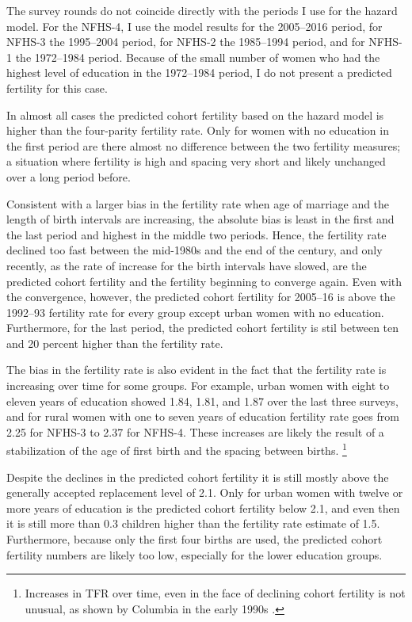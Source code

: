 \documentclass[12pt,letterpaper]{article}
\begin{document}
The survey rounds do not coincide directly with the periods I use for the hazard model.
For the NFHS-4, I use the model results for the 2005--2016 period, 
for NFHS-3 the 1995--2004 period, 
for NFHS-2 the 1985--1994 period, 
and for NFHS-1 the 1972--1984 period.
Because of the small number of women who had the highest level of education in the
1972--1984 period, I do not present a predicted fertility for this case.

In almost all cases the predicted cohort fertility based on the hazard model is higher 
than the four-parity fertility rate.
Only for women with no education in the first period are there almost no difference 
between the two fertility measures; a situation where fertility is high and spacing
very short and likely unchanged over a long period before.

Consistent with a larger bias in the fertility rate when age of marriage and the length of 
birth intervals are increasing, the absolute bias is least in the first and the last 
period and highest in the middle two periods.
Hence, the fertility rate declined too fast between the mid-1980s and the end of the 
century, and only recently, as the rate of increase for the birth intervals have slowed, 
are the predicted cohort fertility and the fertility beginning to converge again.
Even with the convergence, however, the predicted cohort fertility for 2005--16 is 
above the 1992--93 fertility rate for every group except urban women with no education.
Furthermore, for the last period, the predicted cohort fertility is stil between ten
and 20 percent higher than the fertility rate. 

The bias in the fertility rate is also evident in the fact that the fertility rate is 
increasing over time for some groups.
For example, urban women with eight to eleven years of education showed 1.84, 1.81, and
1.87 over the last three surveys, and for rural women with one to seven years of
education fertility rate goes from 2.25 for NFHS-3 to 2.37 for NFHS-4.
These increases are likely the result of a stabilization of the age of first birth and
the spacing between births.%
\footnote{
Increases in TFR over time, even in the face of declining cohort fertility is not 
unusual, as shown by Columbia in the early 1990s \citep{Bongaarts1999}.
}

Despite the declines in the predicted cohort fertility it is still mostly above the 
generally accepted replacement level of 2.1.
Only for urban women with twelve or more years of education is the predicted cohort
fertility below 2.1, and even then it is still more than 0.3 children higher than the 
fertility rate estimate of 1.5.
Furthermore, because only the first four births are used, the predicted cohort fertility
numbers are likely too low, especially for the lower education groups.
\end{document}
